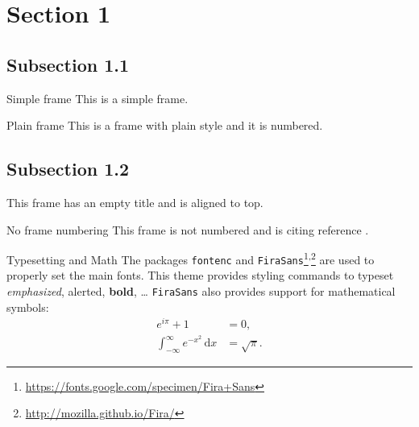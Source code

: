 

    \section{Section 1}
    \subsection{Subsection 1.1}
    \begin{frame}{Simple frame}
        This is a simple frame.
    \end{frame}

    \begin{frame}[plain]{Plain frame}
        This is a frame with plain style and it is numbered.
    \end{frame}
    
    \subsection{Subsection 1.2}
    \begin{frame}[t]
        This frame has an empty title and is aligned to top.
    \end{frame}
    
    \begin{frame}[noframenumbering]{No frame numbering}
        This frame is not numbered and is citing reference \cite{knuth74}.
    \end{frame}
    
    \begin{frame}{Typesetting and Math}
        The packages \texttt{fontenc} and \texttt{FiraSans}\footnote{\url{https://fonts.google.com/specimen/Fira+Sans}}\textsuperscript{,}\footnote{\url{http://mozilla.github.io/Fira/}} are used to properly set the main fonts.
        \vfill
        This theme provides styling commands to typeset \emph{emphasized}, \alert{alerted}, \textbf{bold}, \dots
        \vfill
        \texttt{FiraSans} also provides support for mathematical symbols:
        \begin{align*}
            e^{i\pi} + 1 & = 0, \\
            \int_{-\infty}^\infty e^{-x^2}\,\mathrm{d}x & = \sqrt{\pi}.
        \end{align*}
    \end{frame}

